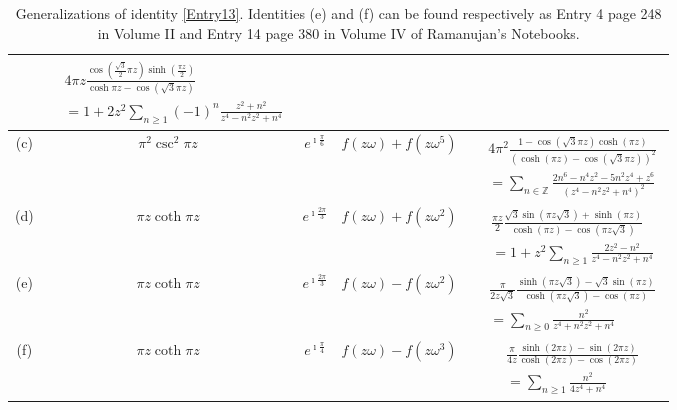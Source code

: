 \documentclass[11pt,oneside,reqno]{article}
\theoremstyle{definition}
\providecommand{\tabularnewline}{\\}
\begin{document}
\begin{table}[h]
\begin{tabular}{|c|c|c|c|c|}
& {$\begin{aligned}
    &4\pi z\frac{\cos\left(\frac{\sqrt{3}}{2}\pi z\right)\sinh\left(\frac{\pi z}{2}\right)}{\cosh\pi z-\cos\left(\sqrt{3}\pi z\right)}\\
    &=1+2z^{2}\sum_{n\ge1}\left(-1\right)^{n}\frac{z^{2}+n^{2}}{z^{4}-n^{2}z^{2}+n^{4}}
\end{aligned}$}
\tabularnewline
\hline 
(c) & $\pi^{2}\csc^{2}\pi z$ & $e^{\imath\frac{\pi}{6}}$ & $f\left(z\omega\right)+f\left(z\omega^{5}\right)$ & {$\begin{aligned}
    &4\pi^{2}\frac{1-\cos\left(\sqrt{3}\pi z\right)\cosh\left(\pi z\right)}{\left(\cosh\left(\pi z\right)-\cos\left(\sqrt{3}\pi z\right)\right)^{2}}\\
    &=\sum_{n\in\mathbb{Z}}\frac{2n^{6}-n^{4}z^{2}-5n^{2}z^{4}+z^{6}}{\left(z^{4}-n^{2}z^{2}+n^{4}\right)^{2}}
\end{aligned}$}
\tabularnewline
\hline 
(d) & $\pi z\coth\pi z$ & $e^{\imath\frac{2\pi}{3}}$ & $f\left(z\omega\right)+f\left(z\omega^{2}\right)$ & {$\begin{aligned}
    &\frac{\pi z}{2}\frac{\sqrt{3}\sin\left(\pi z\sqrt{3}\right)+\sinh\left(\pi z\right)}{\cosh\left(\pi z\right)-\cos\left(\pi z\sqrt{3}\right)}\\
    &=1+z^{2}\sum_{n\ge1}\frac{2z^{2}-n^{2}}{z^{4}-n^{2}z^{2}+n^{4}}
\end{aligned}$}
\tabularnewline
\hline 
(e) & $\pi z\coth\pi z$ & $e^{\imath\frac{2\pi}{3}}$ & $f\left(z\omega\right)-f\left(z\omega^{2}\right)$ & {$\begin{aligned}
    &\frac{\pi}{2z\sqrt{3}}\frac{\sinh\left(\pi z\sqrt{3}\right)-\sqrt{3}\sin\left(\pi z\right)}{\cosh\left(\pi z\sqrt{3}\right)-\cos\left(\pi z\right)}\\
    &=\sum_{n\ge0}\frac{n^{2}}{z^{4}+n^{2}z^{2}+n^{4}}
\end{aligned}$}
\tabularnewline
\hline 
(f) & $\pi z\coth\pi z$ & $e^{\imath\frac{\pi}{4}}$ & $f\left(z\omega\right)-f\left(z\omega^{3}\right)$ & {$\begin{aligned}
    &\frac{\pi}{4z}\frac{\sinh\left(2\pi z\right)-\sin\left(2\pi z\right)}{\cosh\left(2\pi z\right)-\cos\left(2\pi z\right)}\\
    &=\sum_{n\ge1}\frac{n^{2}}{4z^{4}+n^{4}}
\end{aligned}$}
\tabularnewline
\hline 
\end{tabular}
\caption{Generalizations of identity \eqref{Entry13}. Identities (e) and (f) can be found respectively as Entry 4 page 248 in Volume II and Entry 14 page 380 in Volume IV of Ramanujan's Notebooks.}
\label{Table1}
\end{table}
\end{document}
